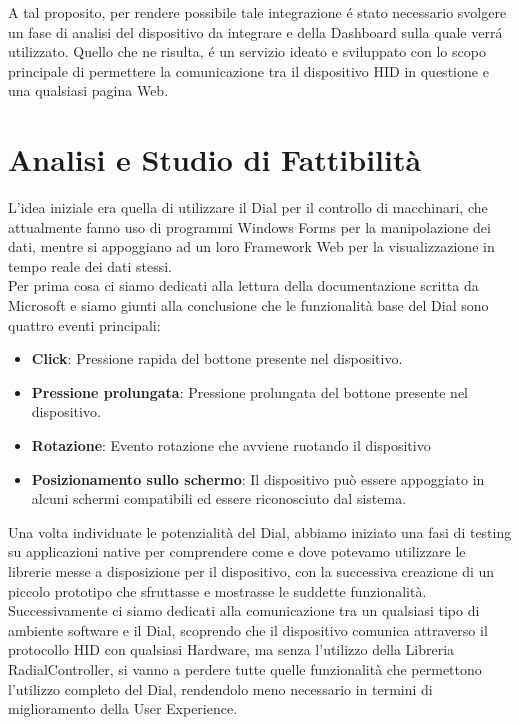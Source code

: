 A tal proposito, per rendere possibile tale integrazione é stato necessario svolgere un fase di analisi del dispositivo da integrare e della Dashboard sulla quale verrá utilizzato. Quello che ne risulta, é un servizio ideato e sviluppato con lo scopo principale di permettere la comunicazione tra il dispositivo HID in questione e una qualsiasi pagina Web.

\newpage
\section{Analisi e Studio di Fattibilità}

L'idea iniziale era quella di utilizzare il Dial per il controllo di macchinari, che attualmente fanno uso di programmi Windows Forms per la manipolazione dei dati, mentre si appoggiano ad un loro Framework Web per la visualizzazione in tempo reale dei dati stessi.\\

Per prima cosa ci siamo dedicati alla lettura della documentazione scritta da Microsoft e siamo giunti alla conclusione che le funzionalità base del Dial sono quattro eventi principali:

\begin{itemize}
\item \textbf{Click}: Pressione rapida del bottone presente nel dispositivo.
\item \textbf{Pressione prolungata}: Pressione prolungata del bottone presente nel dispositivo.
\item \textbf{Rotazione}: Evento rotazione che avviene ruotando il dispositivo
\item \textbf{Posizionamento sullo schermo}: Il dispositivo può essere appoggiato in alcuni schermi compatibili ed essere riconosciuto dal sistema.
\end{itemize}

Una volta individuate le potenzialità del Dial, abbiamo iniziato una fasi di testing su applicazioni native per comprendere come e dove potevamo utilizzare le librerie messe a disposizione per il dispositivo, con la successiva creazione di un piccolo prototipo che sfruttasse e mostrasse le suddette funzionalità.\\

Successivamente ci siamo dedicati alla comunicazione tra un qualsiasi tipo di ambiente software e il Dial, scoprendo che il dispositivo comunica attraverso il protocollo HID con qualsiasi Hardware, ma senza l'utilizzo della Libreria RadialController, si vanno a perdere tutte quelle funzionalità che permettono l'utilizzo completo del Dial, rendendolo meno necessario in termini di miglioramento della User Experience.
 
